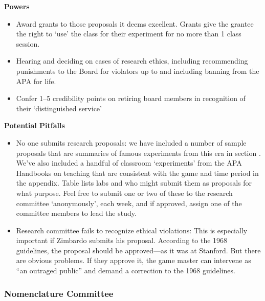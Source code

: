 \begin{refsection}
\begin{itemize}
\end{itemize}

\textbf{Powers} 

\begin{itemize}
\item Award grants to those proposals it deems excellent. Grants give the grantee the right to `use' the class for their experiment for no more than 1 class session.

\item Hearing and deciding on cases of research ethics, including recommending punishments to the Board for violators up to and including banning from the APA for life.

\item Confer 1--5 credibility points on retiring board members in recognition of their ‘distinguished service’

\end{itemize}

\textbf{Potential Pitfalls}

\begin{itemize}
\item No one submits research proposals: we have included a number of sample proposals that are summaries of famous experiments from this era in section . We’ve also included a handful of classroom ‘experiments’ from the APA Handbooks on teaching that are consistent with the game and time period in the appendix. Table  lists labs and who might submit them as proposals for what purpose. Feel free to submit one or two of these to the research committee ‘anonymously’, each week, and if approved, assign one of the committee members to lead the study.

\item Research committee fails to recognize ethical violations: This is especially important if Zimbardo submits his proposal. According to the 1968 guidelines, the proposal should be approved---as it was at Stanford. But there are obvious problems. If they approve it, the game master can intervene as “an outraged public” and demand a correction to the 1968 guidelines.

\end{itemize}

\subsubsection{Nomenclature Committee}
\label{nomenclaturecommittee}


\end{refsection}
